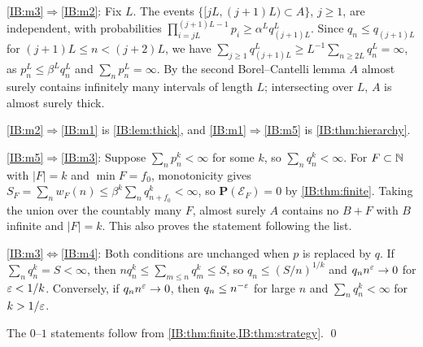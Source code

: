 \ref{IB:m3}$\Rightarrow$\ref{IB:m2}: Fix $L$. The events $\{[jL,(j+1)L)\subset A\}$, $j\ge1$, are
independent, with probabilities
$\prod_{i=jL}^{(j+1)L-1}p_i\ge\alpha^Lq_{(j+1)L}^L$. Since $q_n\le q_{(j+1)L}$ for
$(j+1)L\le n<(j+2)L$, we have $\sum_{j\ge1}q_{(j+1)L}^L\ge L^{-1}\sum_{n\ge2L}q_n^L=\infty$, as
$p_n^L\le\beta^Lq_n^L$ and $\sum_np_n^L=\infty$. By the second Borel--Cantelli lemma $A$ almost
surely contains infinitely many intervals of length $L$; intersecting over $L$, $A$
is almost surely thick.

\ref{IB:m2}$\Rightarrow$\ref{IB:m1} is \cref{IB:lem:thick}, and
\ref{IB:m1}$\Rightarrow$\ref{IB:m5} is \cref{IB:thm:hierarchy}.

\ref{IB:m5}$\Rightarrow$\ref{IB:m3}: Suppose $\sum_np_n^k<\infty$ for some $k$, so $\sum_nq_n^k<\infty$. For
$F\subset\mathbb{N}$ with $|F|=k$ and $\min F=f_0$, monotonicity gives
$S_F=\sum_nw_F(n)\le\beta^k\sum_{n}q_{n+f_0}^k<\infty$, so $\mathbf P(\mathcal E_F)=0$ by \cref{IB:thm:finite}.
Taking the union over the countably many $F$, almost surely $A$ contains no $B+F$
with $B$ infinite and $|F|=k$. This also proves the statement following the list.

\ref{IB:m3}$\Leftrightarrow$\ref{IB:m4}: Both conditions are unchanged when $p$ is replaced
by $q$. If $\sum_nq_n^k=S<\infty$, then $nq_n^k\le\sum_{m\le n}q_m^k\le S$, so
$q_n\le(S/n)^{1/k}$ and $q_nn^\varepsilon\to0$ for $\varepsilon<1/k$. Conversely, if $q_nn^\varepsilon\to0$, then
$q_n\le n^{-\varepsilon}$ for large $n$ and $\sum_nq_n^k<\infty$ for $k>1/\varepsilon$.

The $0$--$1$ statements follow from \cref{IB:thm:finite,IB:thm:strategy}. \qed


